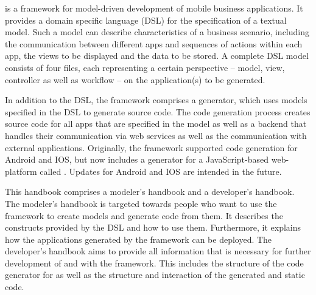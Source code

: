 
\MD is a framework for model-driven development of mobile business applications. It provides a domain specific language (DSL) for the specification of a textual model. Such a model can describe characteristics of a business scenario, including the communication between different apps and sequences of actions within each app, the views to be displayed and the data to be stored. A complete DSL model consists of four files, each representing a certain perspective -- model, view, controller as well as workflow -- on the application(s) to be generated.

In addition to the DSL, the \MD framework comprises a generator, which uses models specified in the DSL to generate source code. The code generation process creates source code for all apps that are specified in the model as well as a backend that handles their communication via web services as well as the communication with external applications. Originally, the \MD framework supported code generation for Android and IOS, but now includes a generator for a JavaScript-based web-platform called \mapapps. Updates for Android and IOS are intended in the future.

This handbook comprises a modeler's handbook and a developer's handbook. The modeler's handbook is targeted towards people who want to use the \MD framework to create models and generate code from them. It describes the constructs provided by the DSL and how to use them. Furthermore, it explains how the applications generated by the framework can be deployed. The developer's handbook aims to provide all information that is necessary for further development of and with the \MD framework. This includes the structure of the code generator for \mapapps as well as the structure and interaction of the generated and static code.
